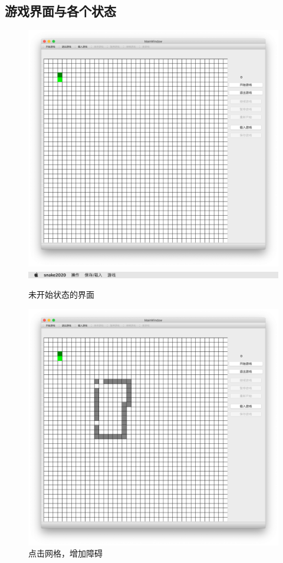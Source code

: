 \documentclass[utf-8]{ctexart}
\begin{document}
    \subsection{游戏界面与各个状态}
    \begin{figure}[H]
        \centering
        \includegraphics[scale = 0.2]{texsrc/界面.png}
        \includegraphics[scale = 0.4]{texsrc/菜单栏.png}
        \caption{未开始状态的界面}
        \label{intialized}
    \end{figure}
    \begin{figure}[H]
        \centering
        \includegraphics[scale = 0.2]{texsrc/界面+wall.png}
        \caption{点击网格，增加障碍}
        \label{obstacle}
    \end{figure}
\end{document}
